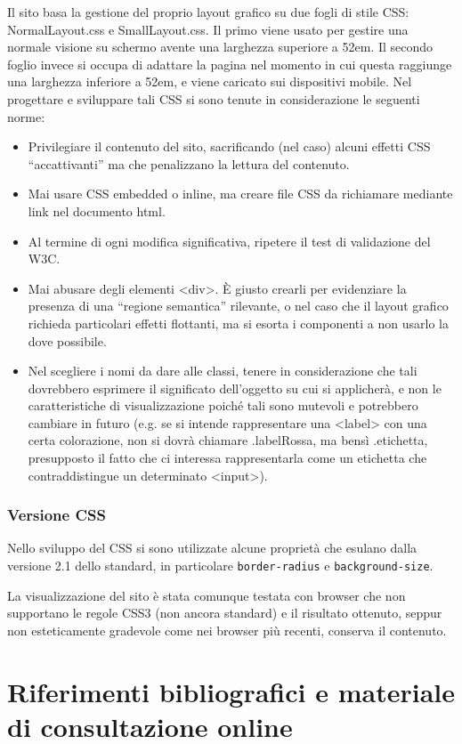 \documentclass[10pt,a4paper,onecolumn]{article}
\begin{document}
Il sito basa la gestione del proprio layout grafico su due fogli di stile CSS: NormalLayout.css e SmallLayout.css. Il primo viene usato per gestire una normale visione su schermo avente una larghezza superiore a 52em. Il secondo foglio invece si occupa di adattare la pagina nel momento in cui questa raggiunge una larghezza inferiore a 52em, e viene caricato sui dispositivi mobile. Nel progettare e sviluppare tali CSS si sono tenute in considerazione le seguenti norme:

\begin{itemize}
  \item Privilegiare il contenuto del sito, sacrificando (nel caso) alcuni effetti CSS ``accattivanti'' ma che penalizzano la lettura del contenuto.
  \item Mai usare CSS embedded o inline, ma creare file CSS da richiamare mediante link nel documento html.
  \item Al termine di ogni modifica significativa, ripetere il test di validazione del W3C.
  \item Mai abusare degli elementi <div>. È giusto crearli per evidenziare la presenza di una ``regione semantica'' rilevante, o nel caso che il layout grafico richieda particolari effetti flottanti, ma si esorta i componenti a non usarlo la dove possibile.
  \item Nel scegliere i nomi da dare alle classi, tenere in considerazione che tali dovrebbero esprimere il significato dell'oggetto su cui si applicherà, e non le caratteristiche di visualizzazione poiché tali sono mutevoli e potrebbero cambiare in futuro (e.g. se si intende rappresentare una <label> con una certa colorazione, non si dovrà chiamare .labelRossa, ma bensì .etichetta, presupposto il fatto che ci interessa rappresentarla come un etichetta che contraddistingue un determinato <input>).
\end{itemize}

\subsubsection{Versione CSS}
Nello sviluppo del CSS si sono utilizzate alcune proprietà che esulano dalla versione 2.1 dello standard, in particolare \verb+border-radius+ e \verb+background-size+.

La visualizzazione del sito è stata comunque testata con browser che non supportano le regole CSS3 (non ancora standard) e il risultato ottenuto, seppur non esteticamente gradevole come nei browser più recenti, conserva il contenuto.

\clearpage

\section{Riferimenti bibliografici e materiale di consultazione online}
\end{document}
